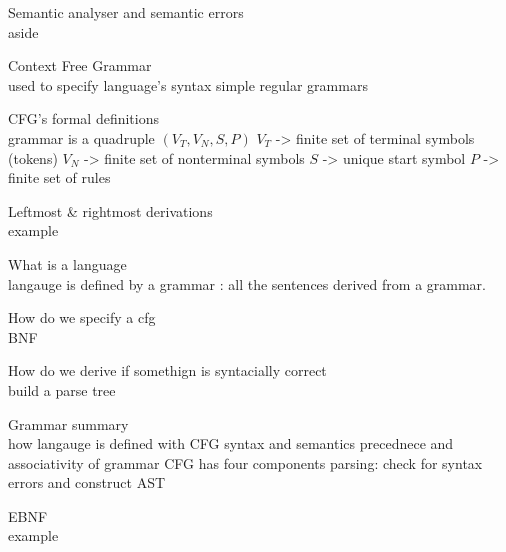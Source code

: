 \documentclass[journal, letterpaper]{IEEEtran}
\begin{document}
\begin{aside}{Semantic analyser and semantic errors}\\
    aside
\end{aside}

\begin{theory}{Context Free Grammar}\\
    used to specify language's syntax 
    simple 
    regular grammars
\end{theory}

\begin{theory}{CFG's formal definitions}\\
    grammar is a quadruple $(V_T, V_N, S, P)$
    $V_T$ -> finite set of terminal symbols (tokens)
    $V_N$ -> finite set of nonterminal symbols
    $S$ -> unique start symbol 
    $P$ -> finite set of rules 
\end{theory}

\begin{example}{Leftmost \& rightmost derivations} \\
    example
\end{example}

\begin{theory}{What is a language} \\
    langauge is defined by a grammar : all the sentences derived from a grammar.

\end{theory}

\begin{theory}{How do we specify a cfg}\\
    BNF
\end{theory}

\begin{theory}{How do we derive if somethign is syntacially correct}\\
    build a parse tree
\end{theory}

\begin{aside}{Grammar summary}\\
    how langauge is defined with CFG
    syntax and semantics
    precednece and associativity of grammar
    CFG has four components
    parsing: check for syntax errors and construct AST
\end{aside}

\begin{example}{EBNF}\\
    example
\end{example}
    
\end{document}

